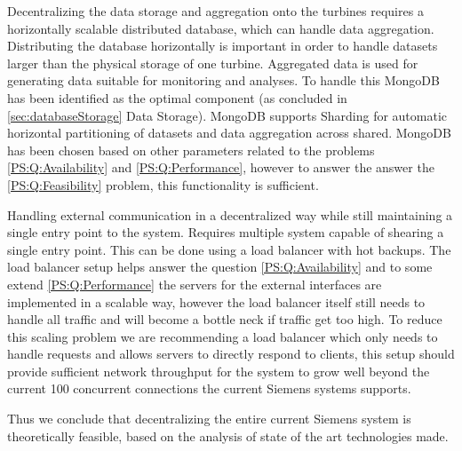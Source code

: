 Decentralizing the data storage and aggregation onto the turbines requires a horizontally scalable distributed database, which can handle data aggregation.
Distributing the database horizontally is important in order to handle datasets larger than the physical storage of one turbine.
Aggregated data is used for generating data suitable for monitoring and analyses.
To handle this MongoDB~\cite{mongodb} has been identified as the optimal component (as concluded in \cref{sec:databaseStorage} Data Storage). MongoDB supports Sharding for automatic horizontal partitioning of datasets and data aggregation across shared. MongoDB has been chosen based on other parameters related to the problems \ref{PS:Q:Availability} and \ref{PS:Q:Performance}, however to answer the answer the \ref{PS:Q:Feasibility} problem, this functionality is sufficient. 

Handling external communication in a decentralized way while still maintaining a single entry point to the system.
Requires multiple system capable of shearing a single entry point.
This can be done using a load balancer with hot backups.
The load balancer setup helps answer the question \ref{PS:Q:Availability} and to some extend \ref{PS:Q:Performance} the servers for the external interfaces are implemented in a scalable way, however the load balancer itself still needs to handle all traffic and will become a bottle neck if traffic get too high.
To reduce this scaling problem we are recommending a load balancer which only needs to handle requests and allows servers to directly respond to clients, this setup should provide sufficient network throughput for the system to grow well beyond the current 100 concurrent connections the current Siemens systems supports.

Thus we conclude that decentralizing the entire current Siemens system is theoretically feasible, based on the analysis of state of the art technologies made. 
\clearpage